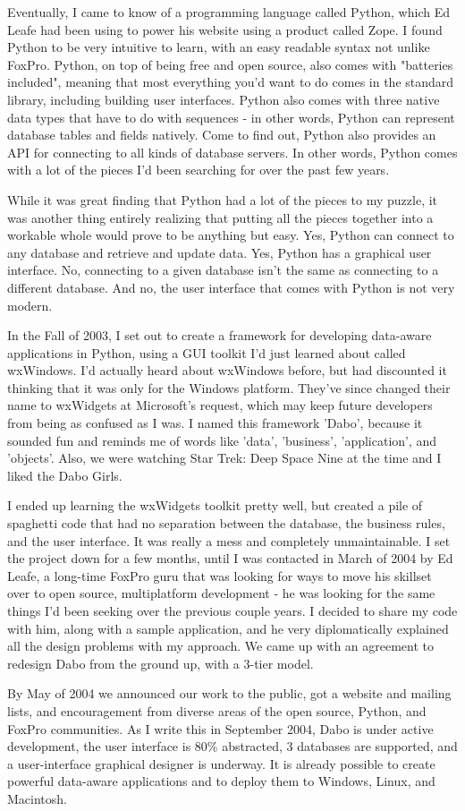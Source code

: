 Eventually, I came to know of a programming language called Python, which Ed 
Leafe had been using to power his website using a product called Zope. I found 
Python to be very intuitive to learn, with an easy readable syntax not unlike FoxPro. 
Python, on top of being free and open source, also comes with "batteries included", 
meaning that most everything you'd want to do comes in the standard library, 
including building user interfaces. Python also comes with three native data types 
that have to do with sequences - in other words, Python can represent database 
tables and fields natively. Come to find out, Python also provides an API for 
connecting to all kinds of database servers. In other words, Python comes with a 
lot of the pieces I'd been searching for over the past few years.

While it was great finding that Python had a lot of the pieces to my puzzle, it was 
another thing entirely realizing that putting all the pieces together into a workable 
whole would prove to be anything but easy. Yes, Python can connect to any 
database and retrieve and update data. Yes, Python has a graphical user interface. 
No, connecting to a given database isn't the same as connecting to a different 
database. And no, the user interface that comes with Python is not very modern.

In the Fall of 2003, I set out to create a framework for developing data-aware 
applications in Python, using a GUI toolkit I'd just learned about called wxWindows. 
I'd actually heard about wxWindows before, but had discounted it thinking that it 
was only for the Windows platform. They've since changed their name to wxWidgets 
at Microsoft's request, which may keep future developers from being as confused 
as I was. I named this framework 'Dabo', because it sounded fun and reminds me of 
words like 'data', 'business', 'application', and 'objects'. Also, we were watching 
Star Trek: Deep Space Nine at the time and I liked the Dabo Girls.

I ended up learning the wxWidgets toolkit pretty well, but created a pile of spaghetti 
code that had no separation between the database, the business rules, and the 
user interface. It was really a mess and completely unmaintainable. I set the project 
down for a few months, until I was contacted in March of 2004 by Ed Leafe, a 
long-time FoxPro guru that was looking for ways to move his skillset over to open 
source, multiplatform development - he was looking for the same things I'd been 
seeking over the previous couple years. I decided to share my code with him, along 
with a sample application, and he very diplomatically explained all the design 
problems with my approach. We came up with an agreement to redesign Dabo from 
the ground up, with a 3-tier model.

By May of 2004 we announced our work to the public, got a website and mailing 
lists, and encouragement from diverse areas of the open source, Python, and FoxPro 
communities. As I write this in September 2004, Dabo is under active development, 
the user interface is 80\% abstracted, 3 databases are supported, and a 
user-interface graphical designer is underway. It is already possible to create 
powerful data-aware applications and to deploy them to Windows, Linux, and 
Macintosh.
